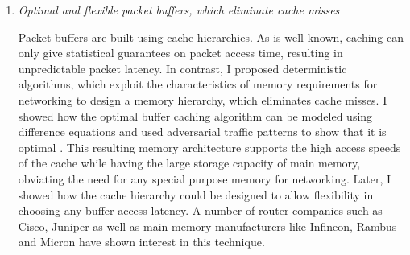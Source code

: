 \documentclass[a4paper, 10pt]{article}
\begin{document}
\begin{small}


\begin{enumerate}


\item {\em Optimal and flexible packet buffers, which eliminate cache misses}


Packet buffers are built using cache hierarchies. As is well known, caching
can only give statistical guarantees on packet access time, resulting in unpredictable packet
latency.
In contrast, I proposed deterministic algorithms, which exploit the characteristics 
of memory requirements for networking to design a memory hierarchy, which eliminates cache misses. 
I showed how the optimal buffer caching algorithm can be modeled using difference equations and
used adversarial traffic patterns to show that it is optimal \cite{buffer}.
This resulting memory architecture supports the high access speeds of the cache while
having the large storage capacity of main memory, obviating the need for any special purpose memory
for networking.
Later, I showed how the cache hierarchy could be designed to allow 
flexibility in choosing any buffer access latency.
A number of router companies such as Cisco, Juniper as well as main memory manufacturers 
like Infineon, Rambus and Micron have shown interest in this technique.



\end{enumerate}
\end{small}
\end{document}
